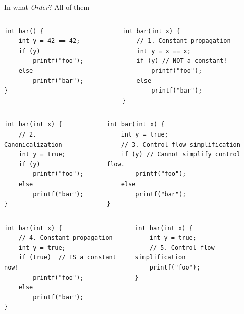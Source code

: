 \documentclass[8pt]{beamer}
\begin{document}
\begin{frame}[fragile]{In what \emph{Order}? All of them}
\begin{columns}[T] %
\begin{column}{.48\textwidth}
\begin{verbatim}
int bar() {
    int y = 42 == 42;
    if (y)
        printf("foo");
    else
        printf("bar");
}
\end{verbatim}
\end{column}
\pause
\begin{column}{.48\textwidth}
\begin{verbatim}
int bar(int x) {
    // 1. Constant propagation
    int y = x == x;
    if (y) // NOT a constant!
        printf("foo");
    else
        printf("bar");
}
\end{verbatim}
\end{column}
\end{columns}
\pause

\begin{columns}[T] %
\begin{column}{.48\textwidth}
\begin{verbatim}
int bar(int x) {
    // 2. Canonicalization
    int y = true;
    if (y)
        printf("foo");
    else
        printf("bar");
}
\end{verbatim}
\end{column}
\pause
\begin{column}{.48\textwidth}
\begin{verbatim}
int bar(int x) {
    int y = true;
    // 3. Control flow simplification
    if (y) // Cannot simplify control flow.
        printf("foo");
    else
        printf("bar");
}
\end{verbatim}
\end{column}
\end{columns}
\pause
\begin{columns}[T] %
\begin{column}{.48\textwidth}
\begin{verbatim}
int bar(int x) {
    // 4. Constant propagation
    int y = true;
    if (true)  // IS a constant now!
        printf("foo");
    else
        printf("bar");
}
\end{verbatim}
\end{column}

\pause
\begin{column}{.48\textwidth}
\begin{verbatim}
int bar(int x) {
    int y = true;
    // 5. Control flow simplification
    printf("foo");
}
\end{verbatim}
\end{column}
\end{columns}
\end{frame}
\end{document}
